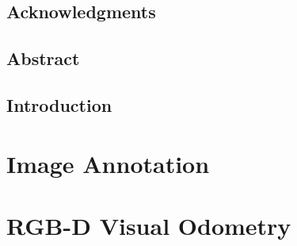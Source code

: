 \frontmatter



\pagestyle{fancy}
\fancyhf{}
\fancyhead[LE]{\leftmark}
\fancyhead[RO]{\rightmark}
\fancyhead[LO]{\today}
\fancyfoot[CE,CO]{\thepage}

\newcommand\Axel[1]{\textbf{\textcolor{red}{(A: #1)}}}

\chapter*{Acknowledgments}%


\chapter*{Abstract}
\small
\vspace{-1em}

\normalsize

\dominitoc%
\tableofcontents

\mainmatter%

\lstset{style=CodeStyle}

\chapter*{Introduction}%
\label{cha:introduction}


\part{Image Annotation}%
\label{prt:image_annotation}


\part{RGB-D Visual Odometry}%
\label{prt:rgb_d_vo}


